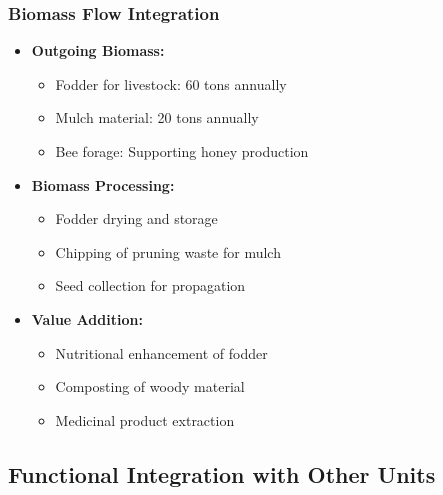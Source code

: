 \subsubsection{Biomass Flow Integration}
\begin{itemize}
    \item \textbf{Outgoing Biomass:}
    \begin{itemize}
        \item Fodder for livestock: 60 tons annually
        \item Mulch material: 20 tons annually
        \item Bee forage: Supporting honey production
    \end{itemize}
    \item \textbf{Biomass Processing:}
    \begin{itemize}
        \item Fodder drying and storage
        \item Chipping of pruning waste for mulch
        \item Seed collection for propagation
    \end{itemize}
    \item \textbf{Value Addition:}
    \begin{itemize}
        \item Nutritional enhancement of fodder
        \item Composting of woody material
        \item Medicinal product extraction
    \end{itemize}
\end{itemize}

\subsection{Functional Integration with Other Units}

